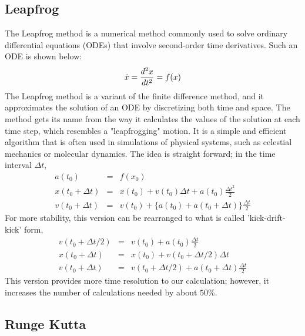 \documentclass[a4paper,oneside,12pt]{report}
\numberwithin{equation}{chapter}
\begin{document}
\subsection{Leapfrog} \label{sec:leapfrog}
The Leapfrog method is a numerical method commonly used to solve ordinary differential equations (ODEs) that involve second-order time derivatives. Such an ODE is shown below:
\begin{equation}
    \ddot{x} = \frac{d^2 x}{dt^2} = f(x) \label{eq:second-order-ODE}
\end{equation}
\newline
The Leapfrog method is a variant of the finite difference method, and it approximates the solution of an ODE by discretizing both time and space. The method gets its name from the way it calculates the values of the solution at each time step, which resembles a "leapfrogging" motion. 
It is a simple and efficient algorithm that is often used in simulations of physical systems, such as celestial mechanics or molecular dynamics.
The idea is straight forward; in the time interval $\Delta t$, 
\begin{eqnarray}
    a(t_0) &=& f(x_0) \nonumber \\
    x(t_0 + \Delta t) &=& x(t_0) + v(t_0)\Delta t + a(t_0)\frac{\Delta t^2}{2} \label{eq:leapfrog_sync_x}\\
    v(t_0 + \Delta t) &=& v(t_0) + \{ a(t_0) + a(t_0 + \Delta t)\}\frac{\Delta t}{2}  \label{eq:leapfrog_sync_v}
\end{eqnarray}
For more stability, this version can be rearranged to what is called 'kick-drift-kick' form,
\begin{eqnarray} \label{eq:leapfrog}
    v(t_0 + \Delta t/2) &=& v(t_0) +  a(t_0)\frac{\Delta t}{2} \nonumber \\
    x(t_0 + \Delta t) &=& x(t_0) + v(t_0 + \Delta t/2)\Delta t \\
    v(t_0 + \Delta t) &=& v(t_0 + \Delta t/2) + a(t_0 + \Delta t)\frac{\Delta t}{2}  \nonumber
\end{eqnarray}
This version provides more time resolution to our calculation; however, it increases the number of calculations needed by about $50\%$.

\subsection{Runge Kutta} \label{sec:rungekutta}
\end{document}
